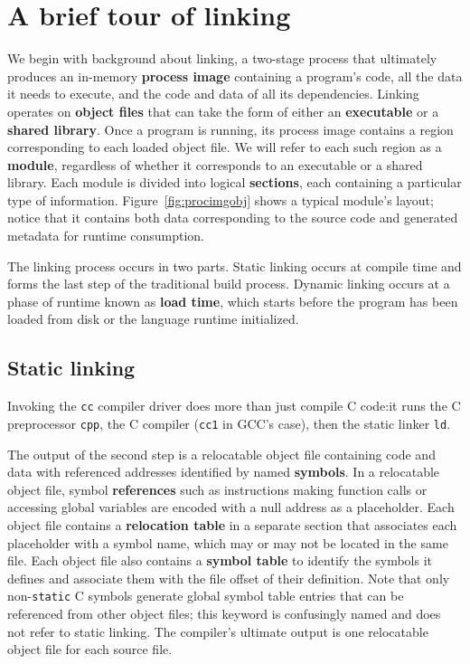 \section{A brief tour of linking}
\label{sec:libgotcha:link}

We begin with background about linking, a two-stage process that ultimately produces
an in-memory \textbf{process image} containing a program's code, all the data it
needs to execute, and the code and data of all its dependencies.  Linking operates on
\textbf{object files} that can take the form of either an \textbf{executable} or a
\textbf{shared library}.  Once a program is running, its process image contains a
region corresponding to each loaded object file.  We will refer to each such region as
a \textbf{module}, regardless of whether it corresponds to an executable or a shared
library.  Each module is divided into logical \textbf{sections}, each containing a
particular type of information.  Figure~\ref{fig:procimgobj} shows a typical module's
layout; notice that it contains both data corresponding to the source code and
generated metadata for runtime consumption.

The linking process occurs in two parts.  Static linking occurs at compile time and
forms the last step of the traditional build process.  Dynamic linking occurs at a
phase of runtime known as \textbf{load time}, which starts before the
program has been loaded from disk or the language runtime initialized.


\subsection{Static linking}

Invoking the \texttt{cc} compiler driver does more than just compile C code:\@ it
runs the C preprocessor \texttt{cpp}, the C compiler (\texttt{cc1} in GCC's case),
then the static linker \texttt{ld}.

The output of the second step is a relocatable object file containing code and data
with referenced addresses identified by named \textbf{symbols}.  In a relocatable
object file, symbol \textbf{references} such as instructions making function calls
or accessing global variables are encoded with a null address as a placeholder.  Each
object file contains a \textbf{relocation table} in a separate section that
associates each placeholder with a symbol name, which may or may not be located in
the same file.  Each object file also contains a \textbf{symbol table} to identify
the symbols it defines and associate them with the file offset of their definition.
Note that only non-\texttt{static} C symbols generate global symbol table entries
that can be referenced from other object files; this keyword is confusingly named and
does not refer to static linking.  The compiler's ultimate output is one relocatable
object file for each source file.

